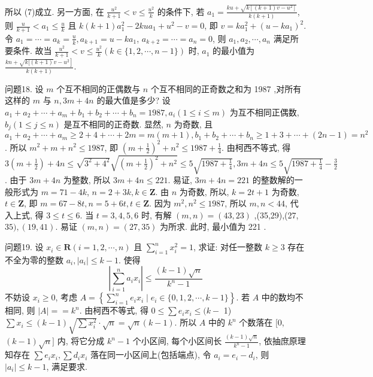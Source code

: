 所以 (7)成立.
另一方面, 在 $\frac{u^2}{k+1}<v \leqslant \frac{u^2}{k}$ 的条件下, 若 $a_1=\frac{k u+\sqrt{k\left[(k+1) v-u^2\right]}}{k(k+1)}$, 则 $\frac{u}{k+1}<a_1 \leqslant \frac{u}{k}$ 且 $k(k+1) a_1^2-2 k u a_1+u^2- v=0$, 即 $v=k a_1^2+\left(u-k a_1\right)^2$. 令 $a_1=\cdots=a_k=\frac{u}{k}, a_{k+1}=u-k a_1$, $a_{k+2}=\cdots=a_n=0$, 则 $a_1, a_2, \cdots, a_n$ 满足所要条件.
故当 $\frac{u^2}{k+1}<v \leqslant \frac{u^2}{k}(k \in \{1,2, \cdots, n-1\})$ 时, $a_1$ 的最小值为 $\frac{\left.k n+\sqrt{k[(k+1)} v-u^2\right]}{k(k+1)}$.



问题18. 设 $m$ 个互不相同的正偶数与 $n$ 个互不相同的正奇数之和为 1987 ,对所有这样的 $m$ 与 $n, 3 m+4 n$ 的最大值是多少?
设 $a_1+a_2+\cdots+a_m+b_1+b_2+\cdots+b_n=1987, a_i(1 \leqslant i \leqslant m)$ 为互不相同正偶数, $b_j(1 \leqslant j \leqslant n)$ 是互不相同的正奇数.
显然, $n$ 为奇数, 且 $a_1+a_2+\cdots+a_m \geqslant 2+4+\cdots+2 m=m(m+1), b_1+b_2+\cdots+b_n \geqslant 1+ 3+\cdots+(2 n-1)=n^2$. 所以 $m^2+m+n^2 \leqslant 1987$, 即 $\left(m+\frac{1}{2}\right)^2+n^2 \leqslant 1987+\frac{1}{4}$. 由柯西不等式, 得 $3\left(m+\frac{1}{2}\right)+4 n \leqslant \sqrt{3^2+4^2} \sqrt{\left(m+\frac{1}{2}\right)^2+n^2} \leqslant 5 \sqrt{1987+\frac{1}{4}}, 3 m+4 n \leqslant 5 \sqrt{1987+\frac{1}{4}}-\frac{3}{2}$. 由于 $3 m+4 n$ 为整数, 所以 $3 m+4 n \leqslant 221$. 易证, $3 m+4 n=221$ 的整数解的一般形式为 $m=71-4 k$, $n=2+3 k, k \in \mathbf{Z}$. 由 $n$ 为奇数, 所以, $k=2 t+1$ 为奇数, $t \in \mathbf{Z}$, 即 $m= 67-8 t, n=5+6 t, t \in \mathbf{Z}$. 因为 $m^2, n^2 \leqslant 1987$, 所以 $m, n<44$, 代入上式, 得 $3 \leqslant t \leqslant 6$. 当 $t=3,4,5,6$ 时, 有解 $(m, n)=(43,23)$ ,(35,29),(27, $35),(19,41)$. 易证 $(m, n)=(27,35)$ 为所求.
此时, 最小值为 221 .



问题19. 设 $x_i \in \mathbf{R}(i=1,2, \cdots, n)$ 且 $\sum_{i=1}^n x_i^2=1$, 求证: 对任一整数 $k \geqslant 3$ 存在不全为零的整数 $a_i,\left|a_i\right| \leqslant k-1$. 使得
$$
\left|\sum_{i=1}^n a_i x_i\right| \leqslant \frac{(k-1) \sqrt{n}}{k^n-1}
$$
不妨设 $x_i \geqslant 0$, 考虑 $A=\left\{\sum_{i=1}^n e_i x_i \mid e_i \in\{0,1,2, \cdots, k-1\}\right\}$. 若 $A$ 中的数均不相同, 则 $|A|==k^n$. 由柯西不等式, 得 $0 \leqslant \sum e_i x_i \leqslant(k-$ 1) $\sum x_i \leqslant(k-1) \sqrt{\sum x_i^2} \cdot \sqrt{n}=\sqrt{n}(k-1)$. 所以 $A$ 中的 $k^n$ 个数落在 $[0$, $(k-1) \sqrt{n}]$ 内, 将它分成 $k^n-1$ 个小区间, 每个小区间长 $\frac{(k-1) \sqrt{n}}{k^n-1}$, 依抽庶原理知存在 $\sum e_i x_i, \sum d_i x_i$ 落在同一小区间上(包括端点), 令 $a_i=e_i-d_i$, 则 $\left|a_i\right| \leqslant k-1$, 满足要求.



